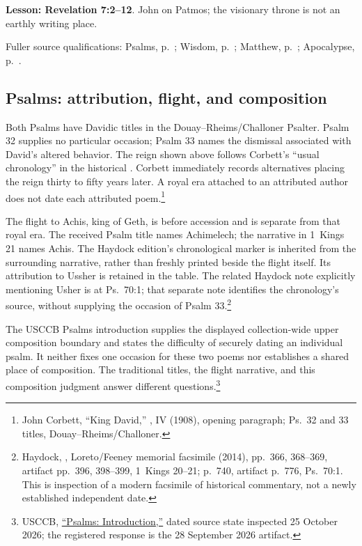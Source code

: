 \noindent\textbf{Lesson: Revelation 7:2--12}. John on Patmos; the visionary throne is not an earthly writing place.


Fuller source qualifications: Psalms, p.~\pageref{hist-psalms};
Wisdom, p.~\pageref{hist-wisdom}; Matthew, p.~\pageref{hist-matthew};
Apocalypse, p.~\pageref{hist-apocalypse}.

\subsection{Psalms: attribution, flight, and composition}
\label{hist-psalms}
Both Psalms have Davidic titles in the Douay--Rheims/Challoner Psalter.
Psalm 32 supplies no particular occasion; Psalm 33 names the dismissal
associated with David's altered behavior. The reign shown above follows
Corbett's ``usual chronology'' in the historical . Corbett immediately records alternatives placing the
reign thirty to fifty years later. A royal era attached to an attributed
author does not date each attributed poem.\footnote{John Corbett,
``King David,'' , IV (1908), opening paragraph;
Ps.~32 and 33 titles, Douay--Rheims/Challoner.}

The flight to Achis, king of Geth, is before accession and is separate
from that royal era. The received Psalm title names Achimelech; the
narrative in 1~Kings 21 names Achis. The Haydock edition's chronological
marker is inherited from the surrounding narrative, rather than freshly
printed beside the flight itself. Its attribution to Ussher is retained
in the table. The related Haydock note explicitly mentioning Usher is
at Ps.~70:1; that separate note identifies the chronology's source,
without supplying the occasion of Psalm 33.\footnote{Haydock,
, Loreto/Feeney memorial
facsimile (2014), pp.~366, 368--369, artifact pp.~396, 398--399,
1~Kings 20--21; p.~740, artifact p.~776, Ps.~70:1. This is inspection
of a modern facsimile of historical commentary, not a newly established
independent date.}

The USCCB Psalms introduction supplies the displayed collection-wide
upper composition boundary and states the difficulty of securely dating
an individual psalm. It neither fixes one occasion for these two poems
nor establishes a shared place of composition. The traditional titles,
the flight narrative, and this composition judgment answer different
questions.\footnote{USCCB, \href{https://bible.usccb.org/bible/psalms/0}{
``Psalms: Introduction,''} dated source state inspected 25 October 2026;
the registered response is the 28 September 2026 artifact.}

